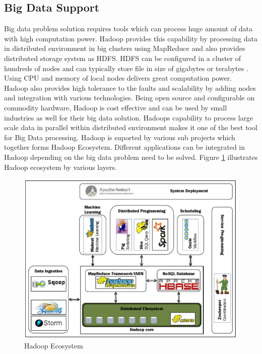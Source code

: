 \documentclass[sigconf]{acmart}
\begin{document}
\subsection{Big Data Support}
Big data problem solution requires tools which can process huge amount of data with high computation power. Hadoop provides this capability by processing data in distributed environment in big clusters using MapReduce and also provides distributed storage system as HDFS. HDFS can be configured in a cluster of hundreds of nodes and can typically store file in size of gigabytes or terabytes \cite{www-hdfs-arch}. Using CPU and memory of local nodes delivers great computation power. Hadoop also provides high tolerance to the faults and scalability by adding nodes and integration with various technologies. Being open source and configurable on commodity hardware, Hadoop is cost effective and can be used by small industries as well for their big data solution. Hadoops capability to process large scale data in parallel within distributed environment makes it one of the best tool for Big Data processing. Hadoop is suported by various sub projects which together forms Hadoop Ecosystem. Different applications can be integrated in Hadoop depending on the big data problem need to be solved.  
Figure \ref{f:hadoopeco} illustrates Hadoop ecosystem by various layers.
\begin{figure}[!ht]
  \centering\includegraphics[width=\columnwidth]{images/hadoopEcosys.PNG}
  \caption{Hadoop Ecosystem \cite[Ch.\ 2, p. 26]{AchariShiva2015HE}}\label{f:hadoopeco}
\end{figure}
\end{document}
